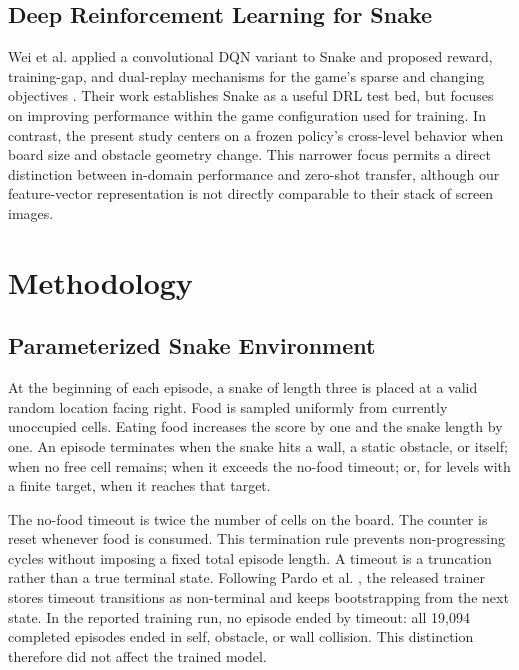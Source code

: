 \documentclass[journal]{IEEEtran}
\begin{document}
\subsection{Deep Reinforcement Learning for Snake}

Wei et al. applied a convolutional DQN variant to Snake and proposed reward,
training-gap, and dual-replay mechanisms for the game's sparse and changing
objectives \cite{wei2018autonomous}. Their work establishes Snake as a useful
DRL test bed, but focuses on improving performance within the game configuration
used for training. In contrast, the present study centers on a frozen policy's
cross-level behavior when board size and obstacle geometry change. This narrower
focus permits a direct distinction between in-domain performance and zero-shot
transfer, although our feature-vector representation is not directly comparable
to their stack of screen images.

\section{Methodology}
\label{sec:methodology}

\subsection{Parameterized Snake Environment}

At the beginning of each episode, a snake of length three is placed at a valid
random location facing right. Food is sampled uniformly from currently unoccupied
cells. Eating food increases the score by one and the snake length by one. An
episode terminates when the snake hits a wall, a static obstacle, or itself;
when no free cell remains; when it exceeds the no-food timeout; or, for levels
with a finite target, when it reaches that target.

The no-food timeout is twice the number of cells on the board. The counter is
reset whenever food is consumed. This termination rule prevents non-progressing
cycles without imposing a fixed total episode length. A timeout is a truncation
rather than a true terminal state. Following Pardo et al.
\cite{pardo2018time}, the released trainer stores timeout transitions as
non-terminal and keeps bootstrapping from the next state. In the
reported training run, no episode ended by timeout: all 19,094 completed
episodes ended in self, obstacle, or wall collision. This distinction therefore
did not affect the trained model.
\end{document}
